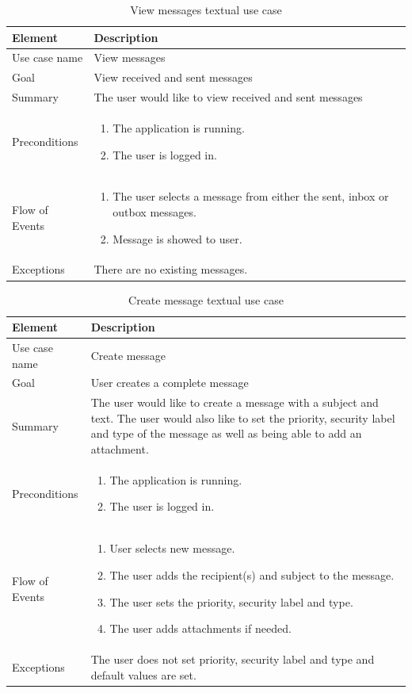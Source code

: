 \begin{table}
\begin{tabular}{p{3cm}|p{12cm}}
Element & Description \\ \hline
Use case name & View messages \\
Goal & View received and sent messages \\
Summary &The user would like to view received and sent messages \\
Preconditions &
\begin{enumerate}
\item{}The application is running.
\item{}The user is logged in.
\end{enumerate} \\ \hline
Flow of Events &
\begin{enumerate}
\item{}The user selects a message from either the sent, inbox or outbox messages.
\item{}Message is showed to user.
\end{enumerate} \\ \hline
Exceptions & There are no existing messages.
\end{tabular}
\caption{View messages textual use case} \label{tab:viewmessages}
\end{table}

\begin{table}
\begin{tabular}{p{3cm}|p{12cm}}
Element & Description \\ \hline
Use case name & Create message \\
Goal & User creates a complete message \\
Summary &The user would like to create a message with a subject and text. The user would also like to set the priority, security label and type of the message as well as being able to add an attachment. \\
Preconditions &
\begin{enumerate}
\item{}The application is running.
\item{}The user is logged in.
\end{enumerate} \\ \hline
Flow of Events &
\begin{enumerate}
\item{}User selects new message.
\item{}The user adds the recipient(s) and subject to the message.
\item{}The user sets the priority, security label and type.
\item{}The user adds attachments if needed.
\end{enumerate} \\ \hline
Exceptions & The user does not set priority, security label and type and default values are set.
\end{tabular}
\caption{Create message textual use case} \label{tab:createmessage}
\end{table}

